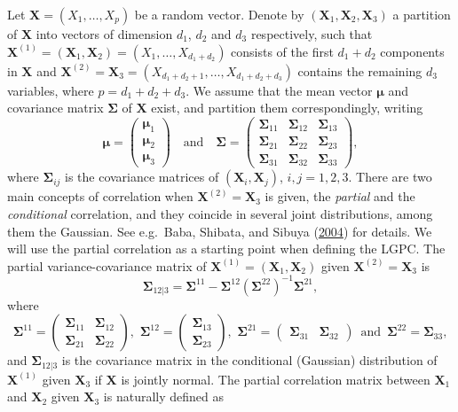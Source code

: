 \documentclass[
  12pt,
  letterpaper]{article}
\newcommand{\X}{\bm{X}}
\newcommand{\Xone}{\bm{X}^{(1)}}
\newcommand{\Xtwo}{\bm{X}^{(2)}}
\newcommand{\fmu}{\bm{\mu}}
\newcommand{\fSigma}{\bm{\Sigma}}
\theoremstyle{definition}
\theoremstyle{definition}
\theoremstyle{definition}
\theoremstyle{remark}
\begin{document}
Let \(\X = (X_1, \ldots, X_p)\) be a random vector. Denote by \((\X_1,\X_2,\X_3)\) a partition of \(\X\) into vectors of dimension \(d_1\), \(d_2\) and \(d_3\) respectively, such that \(\Xone = (\X_1, \X_2) = (X_1, \ldots,X_{d_1 + d_2})\) consists of the first \(d_1+d_2\) components in \(\X\) and \(\Xtwo = \X_3 = (X_{d_1+d_2+1}, \ldots, X_{d_1+d_2+d_3})\) contains the remaining \(d_3\) variables, where \(p = d_1+d_2+d_3\). We assume that the mean vector \(\fmu\) and covariance matrix \(\fSigma\) of \(\X\) exist, and partition them correspondingly, writing
\begin{equation}
\fmu = \begin{pmatrix} \fmu_1 \\ \fmu_2 \\ \fmu_3 \end{pmatrix} \,\,\,\, \textrm{ and } \,\,\,\, \fSigma = \begin{pmatrix} \fSigma_{11} & \fSigma_{12} & \fSigma_{13} \\ \fSigma_{21} & \fSigma_{22} & \fSigma_{23} \\ \fSigma_{31} & \fSigma_{32} & \fSigma_{33}\end{pmatrix},
\label{eq:matrixpartition}
\end{equation}
where \(\fSigma_{ij}\) is the covariance matrices of \((\X_i, \X_j)\), \(i,j = 1,2,3\). There are two main concepts of correlation when \(\Xtwo = \X_3\) is given, the \emph{partial} and the \emph{conditional} correlation, and they coincide in several joint distributions, among them the Gaussian. See e.g.~Baba, Shibata, and Sibuya (\protect\hyperlink{ref-baba2004partial}{2004}) for details. We will use the partial correlation as a starting point when defining the LGPC. The partial variance-covariance matrix of \(\Xone = (\X_1, \X_2)\) given \(\Xtwo = \X_3\) is
\begin{equation}
\fSigma_{12|3} = \fSigma^{11} - \fSigma^{12}\left(\fSigma^{22}\right)^{-1}\fSigma^{21},
\label{eq:matrixpartial}
\end{equation}
where
\[\fSigma^{11} = \begin{pmatrix} \fSigma_{11} & \fSigma_{12} \\ \fSigma_{21} & \fSigma_{22} \end{pmatrix}, \,\, \fSigma^{12} = \begin{pmatrix} \fSigma_{13} \\ \fSigma_{23} \end{pmatrix}, \,\,\fSigma^{21} = \begin{pmatrix} \fSigma_{31} & \fSigma_{32} \end{pmatrix} \, \textrm{ and } \, \fSigma^{22} = \fSigma_{33},\]
and \(\fSigma_{12|3}\) is the covariance matrix in the conditional (Gaussian) distribution of \(\Xone\) given \(\X_3\) if \(\X\) is jointly normal. The partial correlation matrix between \(\X_1\) and \(\X_2\) given \(\X_3\) is naturally defined as
\end{document}

